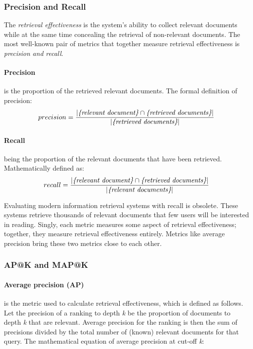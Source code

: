 \subsubsection{Precision and Recall}
\label{subsubsec:precision-recall}
The \emph{retrieval effectiveness} is the system's ability to collect relevant documents while at the same time concealing the retrieval of non-relevant documents. 
The most well-known pair of metrics that together measure retrieval effectiveness is \emph{precision and recall}.

\paragraph*{Precision} is the proportion of the retrieved relevant documents. The formal definition of precision:
\begin{equation}
    precision = \frac{|\emph{\{relevant document\}} \cap \emph{\{retrieved documents\}}|}{|\emph{\{retrieved documents\}}|}
    \label{eq:precision}
\end{equation}


\paragraph*{Recall} being the proportion of the relevant documents that have been retrieved. Mathematically defined as:
\begin{equation}
    recall = \frac{|\emph{\{relevant document\}} \cap \emph{\{retrieved documents\}}|}{|\emph{\{relevant documents\}}|}
    \label{eq:recall}
\end{equation}

Evaluating modern information retrieval systems with recall is obsolete. These systems retrieve thousands of relevant documents that few users will be interested in reading. Singly, each metric measures some aspect of retrieval effectiveness; together, they measure retrieval effectiveness entirely. Metrics like average precision bring these two metrics close to each other.

\subsubsection{AP@K and MAP@K}
\label{subsubsec:ap@k-map@k}
\paragraph*{Average precision (AP)} is the metric used to calculate retrieval effectiveness, which is defined as follows. 
Let the precision of a ranking to depth \emph{k} be
the proportion of documents to depth \emph{k} that are relevant.
Average precision for the ranking is then the sum of precisions divided by the total number of (known) relevant documents for that query.
The mathematical equation of average precision at cut-off \emph{k}:

